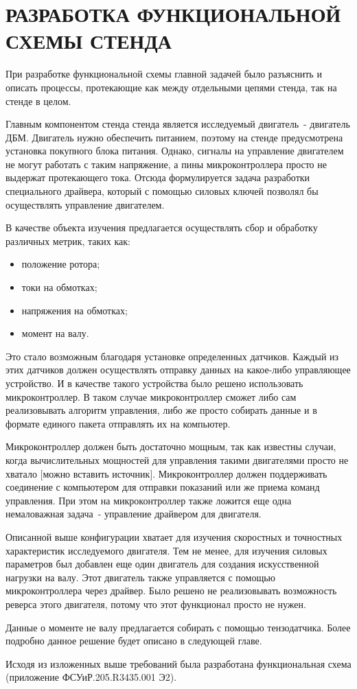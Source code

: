 \section{РАЗРАБОТКА ФУНКЦИОНАЛЬНОЙ СХЕМЫ СТЕНДА}

При разработке функциональной схемы главной задачей было разъяснить и описать
процессы, протекающие как между отдельными цепями стенда, так на стенде в целом.

Главным компонентом стенда стенда является исследуемый двигатель~- двигатель ДБМ. Двигатель нужно
обеспечить питанием, поэтому на стенде предусмотрена установка покупного блока питания.
Однако, сигналы на управление двигателем не могут работать с таким напряжение, а
пины микроконтроллера просто не выдержат протекающего тока. Отсюда формулируется
задача разработки специального драйвера, который с помощью силовых ключей позволял бы
осуществлять управление двигателем.

В качестве объекта изучения предлагается осуществлять сбор и обработку различных метрик, таких как:
\begin{itemize}
  \item положение ротора;
  \item токи на обмотках;
  \item напряжения на обмотках;
  \item момент на валу.
\end{itemize}

Это стало возможным благодаря установке определенных датчиков. Каждый из этих датчиков
должен осуществлять отправку данных на какое-либо управляющее устройство. И в качестве такого
устройства было решено использовать микроконтроллер. В таком случае микроконтроллер сможет
либо сам реализовывать алгоритм управления, либо же просто собирать данные и в формате 
единого пакета отправлять их на компьютер.

Микроконтроллер должен быть достаточно мощным, так как известны случаи, когда вычислительных
мощностей для управления такими двигателями просто не хватало [можно вставить источник]. 
Микроконтроллер должен поддерживать соединение с компьютером для отправки показаний или же
приема команд управления.
При этом на микроконтроллер также ложится еще одна немаловажная задача~- управление драйвером
для двигателя.

Описанной выше конфигурации хватает для изучения скоростных и точностных характеристик исследуемого
двигателя. Тем не менее, для изучения силовых параметров был добавлен еще один двигатель
для создания искусственной нагрузки на валу. Этот двигатель также управляется
с помощью микроконтроллера через драйвер. Было решено не реализовывать возможность реверса этого
двигателя, потому что этот функционал просто не нужен. 

Данные о моменте не валу предлагается собирать с помощью тензодатчика. Более подробно
данное решение будет описано в следующей главе.

Исходя из изложенных выше требований была разработана функциональная схема (приложение ФСУиР.205.R3435.001 Э2). 